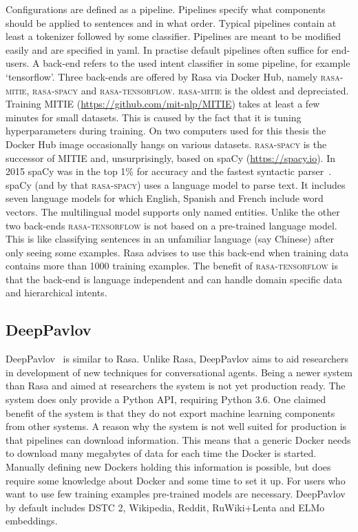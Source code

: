 Configurations are defined as a pipeline.
Pipelines specify what components should be applied to sentences and in what order.
Typical pipelines contain at least a tokenizer followed by some classifier.
Pipelines are meant to be modified easily and are specified in yaml.
In practise default pipelines often suffice for end-users.
A back-end refers to the used intent classifier in some pipeline, for example `tensorflow'.
Three back-ends are offered by Rasa via Docker Hub, namely \textsc{rasa-mitie}, \textsc{rasa-spacy} and \textsc{rasa-tensorflow}.
\textsc{rasa-mitie} is the oldest and depreciated.
Training MITIE (\url{https://github.com/mit-nlp/MITIE}) takes at least a few minutes for small datasets.
This is caused by the fact that it is tuning hyperparameters during training.
On two computers used for this thesis the Docker Hub image occasionally hangs on various datasets.
\textsc{rasa-spacy} is the successor of MITIE and, unsurprisingly, based on spaCy (\url{https://spacy.io}).
In 2015 spaCy was in the top 1\% for accuracy and the fastest syntactic parser~\citep{choi2015depends}.
spaCy (and by that \textsc{rasa-spacy}) uses a language model to parse text.
It includes seven language models for which English, Spanish and French include word vectors.
The multilingual model supports only named entities.
Unlike the other two back-ends \textsc{rasa-tensorflow} is not based on a pre-trained language model.
This is like classifying sentences in an unfamiliar language (say Chinese) after only seeing some examples.
Rasa advises to use this back-end when training data contains more than 1000 training examples.
The benefit of \textsc{rasa-tensorflow} is that the back-end is language independent and can handle domain specific data and hierarchical intents.

\subsection{DeepPavlov}
\label{subsec:deeppavlov}
DeepPavlov~\citep{burtsev2018} is similar to Rasa.
Unlike Rasa, DeepPavlov aims to aid researchers in development of new techniques for conversational agents.
Being a newer system than Rasa and aimed at researchers the system is not yet production ready.
The system does only provide a Python API, requiring Python 3.6.
One claimed benefit of the system is that they do not export machine learning components from other systems.
A reason why the system is not well suited for production is that pipelines can download information.
This means that a generic Docker needs to download many megabytes of data for each time the Docker is started.
Manually defining new Dockers holding this information is possible, but does require some knowledge about Docker and some time to set it up.
For users who want to use few training examples pre-trained models are necessary.
DeepPavlov by default includes DSTC 2, Wikipedia, Reddit, RuWiki+Lenta and ELMo embeddings.

